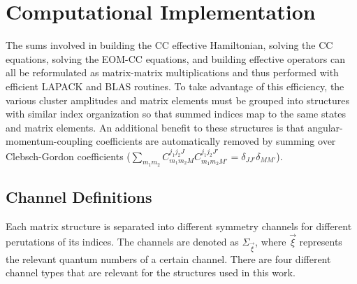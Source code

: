 \documentclass[thesis.tex]{subfiles}
\begin{document}
\chapter{Computational Implementation} \label{chapter:appendix_computational}

The sums involved in building the CC effective Hamiltonian, solving the CC equations, solving the EOM-CC equations, and building effective operators can all be reformulated as matrix-matrix multiplications and thus performed with efficient LAPACK and BLAS routines.  To take advantage of this efficiency, the various cluster amplitudes and matrix elements must be grouped into structures with similar index organization so that summed indices map to the same states and matrix elements.  An additional benefit to these structures is that angular-momentum-coupling coefficients are automatically removed by summing over Clebsch-Gordon coefficients ($\sum_{m_{1}m_{2}}C^{j_{1}j_{2}J}_{m_{1}m_{2}M}C^{j_{1}j_{2}J'}_{m_{1}m_{2}M'}=\delta_{JJ'}\delta_{MM'}$).

\section{Channel Definitions}

Each matrix structure is separated into different symmetry channels for different perutations of its indices.  The channels are denoted as $\Sigma_{\vec{\xi}}$, where $\vec{\xi}$ represents the relevant quantum numbers of a certain channel.  There are four different channel types that are relevant for the structures used in this work.
\end{document}
